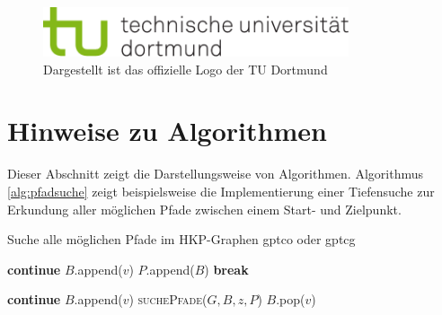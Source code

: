 \begin{figure}[htbp]
  \centering
  \includegraphics[width=9cm]{images/logos/tud_logo_rgb}
  \caption{Dargestellt ist das offizielle Logo der TU Dortmund \parencite{TuDo2}}
  \label{fig:tud_logo}
\end{figure}


\section{Hinweise zu Algorithmen}
\label{hinweise:algorithmen}

Dieser Abschnitt zeigt die Darstellungsweise von Algorithmen.
Algorithmus \ref{alg:pfadsuche} zeigt beispielsweise die Implementierung einer Tiefensuche zur Erkundung aller möglichen Pfade zwischen einem Start- und Zielpunkt. 
\begin{algorithm}
  \caption{Suche alle möglichen Pfade im HKP-Graphen \gls{gptco} oder \gls{gptcg}}
    \label{alg:pfadsuche}
  \begin{algorithmic}[1]
    \Statex
       
        
        \State \textbf{continue}
       \EndIf
        
        \State $B$.append($v$) 
        \State $P$.append($B$) 
        \State \textbf{break}
       \EndIf
      \EndFor
      
        
        \State \textbf{continue}        
       \EndIf
       \State $B$.append($v$) 
       \State \textsc{suchePfade}($G,B,z,P$) 
       \State $B$.pop($v$)
      \EndFor
    \EndFunction
  \end{algorithmic}
\end{algorithm}

